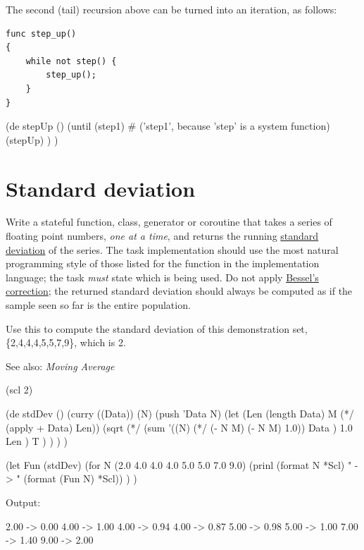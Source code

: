 The second (tail) recursion above can be turned into an iteration, as
follows:

\begin{verbatim}
func step_up()
{
    while not step() {
        step_up();
    }
}
\end{verbatim}



\begin{wideverbatim}

(de stepUp ()
   (until (step1)  # ('step1', because 'step' is a system function)
      (stepUp) ) )

\end{wideverbatim}

\pagebreak{}
\section*{Standard deviation}

Write a stateful function, class, generator or coroutine that takes a
series of floating point numbers, \emph{one at a time}, and returns the
running \href{http://en.wikipedia.org/wiki/Standard\_Deviation}{standard
deviation} of the series. The task implementation should use the most
natural programming style of those listed for the function in the
implementation language; the task \emph{must} state which is being used.
Do not apply
\href{http://en.wikipedia.org/wiki/Bessel\%27s\_correction}{Bessel's
correction}; the returned standard deviation should always be computed
as if the sample seen so far is the entire population.

Use this to compute the standard deviation of this demonstration set,
\{2,4,4,4,5,5,7,9\}, which is 2.

See also: \emph{Moving Average}


\begin{wideverbatim}

(scl 2)

(de stdDev ()
   (curry ((Data)) (N)
      (push 'Data N)
      (let (Len (length Data)  M (*/ (apply + Data) Len))
         (sqrt
            (*/
               (sum
                  '((N) (*/ (- N M) (- N M) 1.0))
                  Data )
               1.0
               Len )
            T ) ) ) )

(let Fun (stdDev)
   (for N (2.0 4.0 4.0 4.0 5.0 5.0 7.0 9.0)
      (prinl (format N *Scl) " -> " (format (Fun N) *Scl)) ) )

Output:

2.00 -> 0.00
4.00 -> 1.00
4.00 -> 0.94
4.00 -> 0.87
5.00 -> 0.98
5.00 -> 1.00
7.00 -> 1.40
9.00 -> 2.00

\end{wideverbatim}

